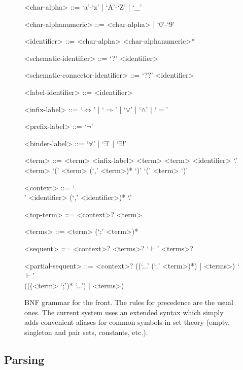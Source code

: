 \begin{figure}[H]
  \centering
  \begin{framed}
  \begin{grammar}
  <char-alpha> ::= `a'-`z' | `A'-`Z' | `_'
  
  <char-alphanumeric> ::= <char-alpha> | `0'-`9'
  
  <identifier> ::= <char-alpha> <char-alphanumeric>*
  
  <schematic-identifier> ::= `?' <identifier>
  
  <schematic-connector-identifier> ::= `??' <identifier>
  
  <label-identifier> ::= <identifier>
  
  <infix-label> ::= `\(\Leftrightarrow\)' | `\(\Rightarrow\)' | `\(\lor\)' | `\(\land\)' | `\(=\)'
  
  <prefix-label> ::= `\(\neg\)'
  
  <binder-label> ::= `\(\forall\)' | `\(\exists\)' | `\(\exists!\)'
  
  <term> ::= <term> <infix-label> <term>
   <term>
   <identifier> `.' <term>
   `(' <term> (`,' <term>)* `)'
  \alt `(' <term> `)'
  
  <context> ::= `\\' <identifier> (`,' <identifier>)* `.'
  
  <top-term> ::= <context>? <term>
  
  <terms> ::= <term> (`;' <term>)*
  
  <sequent> ::= <context>? <terms>? `\(\vdash\)' <terms>?
  
  <partial-sequent> ::= <context>? ((`...' (`;' <term>)*) | <terms>) `\(\vdash\)' \\
  (((<term> `;')* `...') | <terms>)
  \end{grammar}
  \end{framed}
  \caption[BNF grammar]{BNF grammar for the front. The rules for precedence are the usual ones. The current system uses an extended syntax which simply adds convenient aliases for common symbols in set theory (empty, singleton and pair sets, constants, etc.).}
  \label{fig:grammar}
\end{figure}

\subsection{Parsing}

